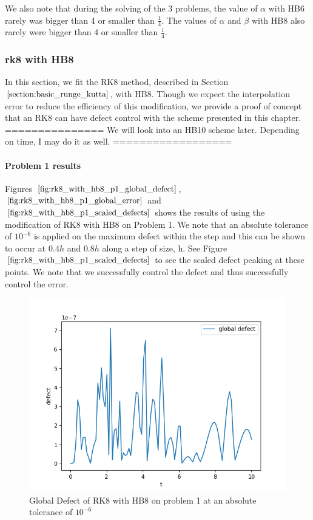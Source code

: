 \documentclass{article}
\begin{document}
We also note that during the solving of the 3 problems, the value of $\alpha$ with HB6 rarely was bigger than 4 or smaller than $\frac{1}{4}$. The values of $\alpha$ and $\beta$ with HB8 also rarely were bigger than 4 or smaller than $\frac{1}{4}$. 

\subsubsection{rk8 with HB8}
In this section, we fit the RK8 method, described in Section $\ref{section:basic_runge_kutta}$, with HB8. Though we expect the interpolation error to reduce the efficiency of this modification, we provide a proof of concept that an RK8 can have defect control with the scheme presented in this chapter. 
===============
We will look into an HB10 scheme later. Depending on time, I may do it as well.
==================
\paragraph{Problem 1 results}
Figures $\ref{fig:rk8_with_hb8_p1_global_defect}$, $\ref{fig:rk8_with_hb8_p1_global_error}$ and $\ref{fig:rk8_with_hb8_p1_scaled_defects}$ shows the results of using the modification of RK8 with HB8 on Problem 1. We note that an absolute tolerance of $10^{-6}$ is applied on the maximum defect within the step and this can be shown to occur at $0.4h$ and $0.8h$ along a step of size, h. See Figure $\ref{fig:rk8_with_hb8_p1_scaled_defects}$ to see the scaled defect peaking at these points. We note that we successfully control the defect and thus successfully control the error.

\begin{figure}[H]
\centering
\includegraphics[width=0.7\linewidth]{./figures/rk8_with_hb8_p1_global_defect}
\caption{Global Defect of RK8 with HB8 on problem 1 at an absolute tolerance of $10^{-6}$}
\label{fig:rk8_with_hb8_p1_global_defect}
\end{figure}
\end{document}
